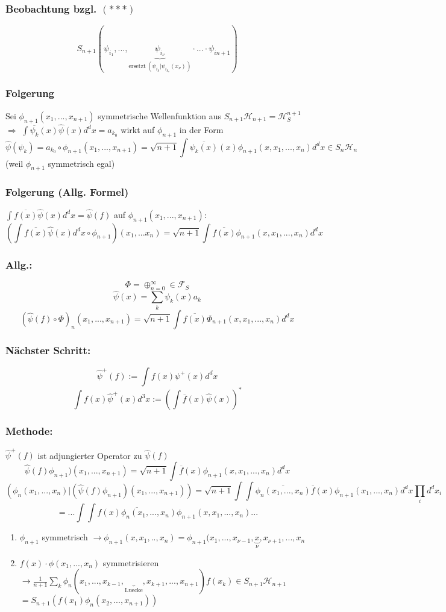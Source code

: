 \documentclass[twoside,a4paper]{scrartcl}
\renewcommand{\1}{\mathds{1}}
\newcommand{\Ra}{\Rightarrow}
\newcommand{\ra}{\rightarrow}
\renewcommand{\H}{\mathcal{H}}
\newcommand{\F}{\mathcal{F}}
\begin{document}
\subsubsection*{Beobachtung bzgl. $(***)$}
$$S_{n+1}(\psi_{i_1},...,\underbrace{\psi_{i_\nu}}_{\mathrm{ersetzt} \ (\psi_{i_k}|\psi_{i_{k_\nu}}(x_\nu)) }\cdot ... \cdot \psi_{i{n+1}})$$

\subsubsection*{Folgerung}
Sei $\phi_{n+1}(x_1,...,x_{n+1})$ symmetrische Wellenfunktion aus $S_{n+1}\H_{n+1}=\H_S^{n+1}$ $\Ra$ $\int \overline{\psi_{k}}(x)\hat \psi(x) d^dx=a_{k_0}$ wirkt auf $\phi_{n+1}$ in der Form 
$$\hat \psi(\psi_k)=a_{k_0} \circ \phi_{n+1} (x_1,...,x_{n+1})=\sqrt{n+1}\int \overline{\psi_k(x)}(x) \phi_{n+1}(x,x_1,...,x_n) d^dx \in S_n\H_n$$
(weil $\phi_{n+1}$ symmetrisch egal)

\subsubsection*{Folgerung (Allg. Formel)}
$\int \overline{f(x)} \hat \psi(x)d^dx=\hat \psi (f)$ auf $\phi_{n+1}(x_1,...,x_{n+1})$:
$$(\int \overline{f(x)} \hat \psi(x)d^dx \circ \phi_{n+1})(x_1,...x_n)=\sqrt{n+1} \int \overline{f(x)} \phi_{n+1}(x,x_1,...,x_n)d^dx$$
\subsubsection*{Allg.:}
$$\Phi=\oplus_{n=0}^{\infty} \in \F_S$$
$$\hat \psi(x)=\sum_k \psi_k(x) a_k$$
$$(\hat \psi(f) \circ \Phi)_n(x_1,...,x_{n+1})=\sqrt{n+1}\int \overline{f(x)} \Phi_{n+1}(x,x_1,...,x_n)d^dx$$

\subsubsection*{Nächster Schritt:}
$$\hat \psi^+(f):=\int f(x) \psi^+(x)d^dx$$
$$\int f(x)\hat \psi^+(x)d^3x:=(\int \overline{f}(x)\hat \psi(x))^*$$
\subsubsection*{Methode:}
$\hat \psi^+(f)$ ist adjungierter Operator zu $\hat \psi(f)$
$$\hat \psi(f)\phi_{n+1})(x_1,...,x_{n+1})=\sqrt{n+1}\int \overline{f}(x)\phi_{n+1}(x,x_1,...,x_n)d^dx$$
$$(\phi_n(x_1,...,x_n)|(\hat \psi(f)\phi_{n+1})(x_1,...,x_{n+1}))=\sqrt{n+1}\int \int \overline{\phi_n(x_1,...,x_n)}\overline{f}(x) \phi_{n+1}(x_1,...,x_n)d^dx \prod_i d^dx_i$$
$$=...\int \int \overline{f(x)\phi_n(x_1,...,x_n)} \phi_{n+1}(x,x_1,...,x_n)...$$
\begin{enumerate}
\item $\phi_{n+1}$ symmetrisch $\ra \phi_{n+1}(x,x_1,..,x_n)=\phi_{n+1}(x_1,...,x_{\nu-1},\underbrace{x}_{\nu},x_{\nu+1},...,x_n$
\item $f(x) \cdot \phi(x_1,...,x_n)$ symmetrisieren $\ra \frac{1}{n+1} \sum_k \phi_n(x_1,...,x_{k-1},\underbrace{\ }_{\mathrm{Luecke}},x_{k+1},...,x_{n+1})f(x_k) \in S_{n+1}\H_{n+1}$\\
$=S_{n+1}(f(x_1)\phi_n(x_2,...,x_{n+1}))$
\end{enumerate}
\end{document}
